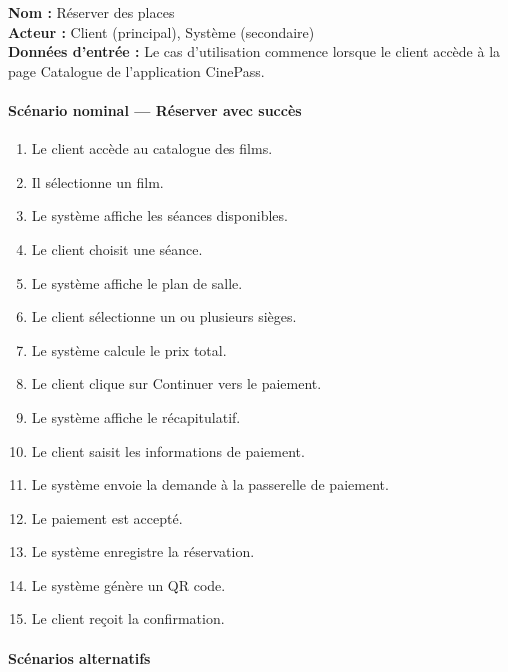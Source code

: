 \documentclass[12pt]{report}
\begin{document}
\textbf{Nom :} Réserver des places \\
\textbf{Acteur :} Client (principal), Système (secondaire) \\
\textbf{Données d'entrée :} Le cas d'utilisation commence lorsque le client accède à la page Catalogue de l'application CinePass.

\paragraph{Scénario nominal — Réserver avec succès}
\begin{enumerate}
    \item Le client accède au catalogue des films.
    \item Il sélectionne un film.
    \item Le système affiche les séances disponibles.
    \item Le client choisit une séance.
    \item Le système affiche le plan de salle.
    \item Le client sélectionne un ou plusieurs sièges.
    \item Le système calcule le prix total.
    \item Le client clique sur Continuer vers le paiement.
    \item Le système affiche le récapitulatif.
    \item Le client saisit les informations de paiement.
    \item Le système envoie la demande à la passerelle de paiement.
    \item Le paiement est accepté.
    \item Le système enregistre la réservation.
    \item Le système génère un QR code.
    \item Le client reçoit la confirmation.
\end{enumerate}

\paragraph{Scénarios alternatifs}
\end{document}

